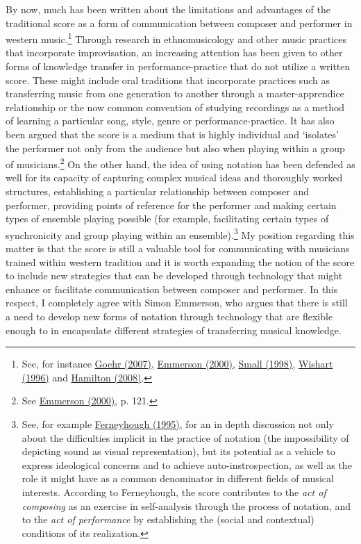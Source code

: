 By now, much has been written about the limitations and advantages of the traditional score as a form of communication between composer and performer in western music.\footnote{See, for instance \hyperlink{goer}{Goehr (2007)}, \hyperlink{emmersoncross}{Emmerson (2000)}, \hyperlink{small}{Small (1998)}, \hyperlink{wishart}{Wishart (1996)} and \hyperlink{hamilton}{Hamilton (2008)}.} Through research in \mbox{ethnomusicology} and other music practices that incorporate improvisation, an increasing attention has been given to other forms of knowledge transfer in performance-practice that do not utilize a written score. These might include oral traditions that incorporate practices such as transferring music from one generation to another through a master-apprendice relationship or the now common convention of studying recordings as a method of learning a particular song, style, genre or performance-practice. It has also been argued that the score is a medium that is highly individual and `isolates' the performer not only from the audience but also when playing within a group of musicians.\footnote{See \hyperlink{emmersoncross}{Emmerson (2000)}, p. 121.} On the other hand, the idea of using notation has been defended as well for its capacity of capturing complex musical ideas and thoroughly worked structures, establishing a particular relationship between composer and performer, providing points of reference for the performer and making certain types of ensemble playing possible (for example, facilitating certain types of synchronicity and group playing within an ensemble).\footnote{See, for example \hyperlink{ferneyhough}{Ferneyhough (1995)}, for an in depth discussion not only about the difficulties implicit in the practice of notation (the impossibility of depicting sound as visual representation), but its potential as a vehicle to express ideological concerns and to achieve auto-instrospection,  as well as the role it might have as a common denominator in different fields of musical interests. According to Ferneyhough, the score contributes to the \emph{act of composing} as an exercise in self-analysis through the process of notation, and to the \emph{act of performance} by establishing the (social and contextual) conditions of its realization.} My position regarding this matter is that the score is still a valuable tool for communicating with musicians trained within western tradition and it is worth expanding the notion of the score to include new strategies that can be developed through technology that might enhance or facilitate communication between composer and performer. In this respect, I completely agree with Simon Emmerson, who argues that there is still a need to develop new forms of notation through technology that are flexible enough to in encapsulate different strategies of transferring musical knowledge. 
